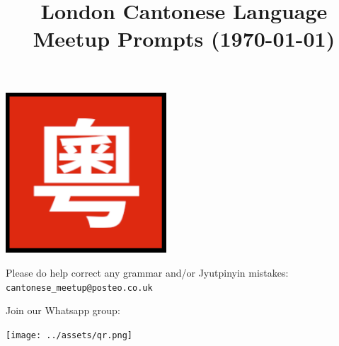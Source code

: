 \title{\vspace{-0.5cm} London Cantonese Language Meetup Prompts (\today{})}
\author{}
\date{}
\maketitle

\vspace{-2cm}

\begin{center}
  \includegraphics[width=0.45\textwidth]{../assets/logo.png}
\end{center}

Please do help correct any grammar and/or Jyutpinyin mistakes: \texttt{cantonese\_meetup@posteo.co.uk}

Join our Whatsapp group:

\begin{center}
  \texttt{[image: ../assets/qr.png]}
\end{center}

